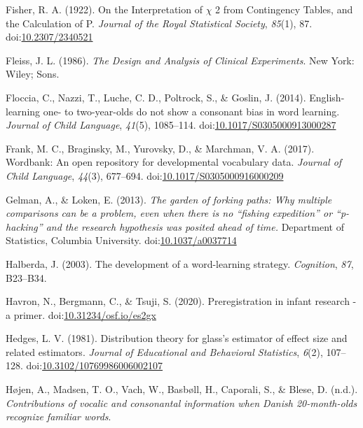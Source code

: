 \documentclass[man]{apa6}
\begin{document}
\leavevmode\hypertarget{ref-Fisher1922}{}%
Fisher, R. A. (1922). On the Interpretation of \(\chi\) 2 from Contingency Tables, and the Calculation of P. \emph{Journal of the Royal Statistical Society}, \emph{85}(1), 87. doi:\href{https://doi.org/10.2307/2340521}{10.2307/2340521}

\leavevmode\hypertarget{ref-Fleiss1986}{}%
Fleiss, J. L. (1986). \emph{The Design and Analysis of Clinical Experiments}. New York: Wiley; Sons.

\leavevmode\hypertarget{ref-Floccia2014}{}%
Floccia, C., Nazzi, T., Luche, C. D., Poltrock, S., \& Goslin, J. (2014). English-learning one- to two-year-olds do not show a consonant bias in word learning. \emph{Journal of Child Language}, \emph{41}(5), 1085--114. doi:\href{https://doi.org/10.1017/S0305000913000287}{10.1017/S0305000913000287}

\leavevmode\hypertarget{ref-Frank2017}{}%
Frank, M. C., Braginsky, M., Yurovsky, D., \& Marchman, V. A. (2017). Wordbank: An open repository for developmental vocabulary data. \emph{Journal of Child Language}, \emph{44}(3), 677--694. doi:\href{https://doi.org/10.1017/S0305000916000209}{10.1017/S0305000916000209}

\leavevmode\hypertarget{ref-Gelman2013}{}%
Gelman, A., \& Loken, E. (2013). \emph{The garden of forking paths: Why multiple comparisons can be a problem, even when there is no ``fishing expedition'' or ``p-hacking'' and the research hypothesis was posited ahead of time.} Department of Statistics, Columbia University. doi:\href{https://doi.org/10.1037/a0037714}{10.1037/a0037714}

\leavevmode\hypertarget{ref-Halberda2003}{}%
Halberda, J. (2003). The development of a word-learning strategy. \emph{Cognition}, \emph{87}, B23--B34.

\leavevmode\hypertarget{ref-Havron}{}%
Havron, N., Bergmann, C., \& Tsuji, S. (2020). Preregistration in infant research - a primer. doi:\href{https://doi.org/10.31234/osf.io/es2gx}{10.31234/osf.io/es2gx}

\leavevmode\hypertarget{ref-Hedges1981}{}%
Hedges, L. V. (1981). Distribution theory for glass's estimator of effect size and related estimators. \emph{Journal of Educational and Behavioral Statistics}, \emph{6}(2), 107--128. doi:\href{https://doi.org/10.3102/10769986006002107}{10.3102/10769986006002107}

\leavevmode\hypertarget{ref-Hojen}{}%
Højen, A., Madsen, T. O., Vach, W., Basbøll, H., Caporali, S., \& Blese, D. (n.d.). \emph{Contributions of vocalic and consonantal information when Danish 20-month-olds recognize familiar words}.
\end{document}
